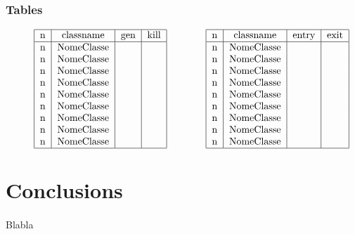 \documentclass[letterpaper,twocolumn,10pt]{article}
\begin{document}
\subsubsection{Tables}
\begin{figure*} [ht]
\begin{align*}
\begin{tabular}{|l|*{3}{c|}}
  \hline
  n & classname & gen & kill  \\
  \hline 
  n & NomeClasse &  & \\
  n & NomeClasse &  & \\
  n & NomeClasse &  & \\
  n & NomeClasse &  & \\
  n & NomeClasse &  & \\
  n & NomeClasse &  & \\
  n & NomeClasse &  & \\
  n & NomeClasse &  & \\
  n & NomeClasse &  & \\
  \hline
\end{tabular}
\qquad \qquad
\begin{tabular}{|l|*{3}{c|}}
  \hline
  n & classname & entry & exit  \\
  \hline 
  n & NomeClasse &  & \\
  n & NomeClasse &  & \\
  n & NomeClasse &  & \\
  n & NomeClasse &  & \\
  n & NomeClasse &  & \\
  n & NomeClasse &  & \\
  n & NomeClasse &  & \\
  n & NomeClasse &  & \\
  n & NomeClasse &  & \\
  \hline
\end{tabular}
\end{align*}
\end{figure*}

\section{Conclusions}
\paragraph{}
Blabla
\end{document}

